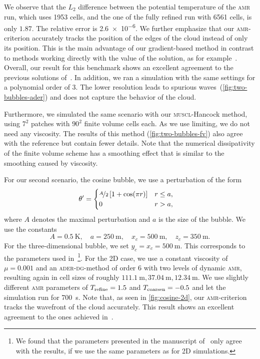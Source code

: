 \documentclass[runningheads]{llncs}
\newcommand{\muscl}{\textsc{muscl}-Hancock}
\newcommand{\aderdg}{\textsc{ader-dg}}
\newcommand{\amr}{\textsc{amr}}
\newcommand{\pertubationPotT}{\theta'}
\begin{document}
We observe that the $L_2$ difference between the potential temperature of the \amr{} run, which uses 1953 cells, and the one of the fully refined run with 6561 cells, is only $1.87$.
The relative error is \num{2.6e-6}.
We further emphasize that our \amr{}-criterion accurately tracks the position of the edges of the cloud instead of only its position.
This is the main advantage of our gradient-based method in contrast to methods working directly with the value of the solution, as for example~\cite{muller2010adaptive}.
Overall, our result for this benchmark shows an excellent agreement to the previous solutions of~\cite{muller2010adaptive}.
In addition, we ran a simulation with the same settings for a polynomial order of 3.
The lower resolution leads to spurious waves~(\cref{fig:two-bubbles-ader}) and does not capture the behavior of the cloud.

Furthermore, we simulated the same scenario with our \muscl{} method, using $7^2$ patches with $90^2$ finite volume cells each.
As we use limiting, we do not need any viscosity.
The results of this method (\cref{fig:two-bubbles-fv}) also agree with the reference but contain fewer details.
Note that the numerical dissipativity of the finite volume scheme has a smoothing effect that is similar to the smoothing caused by viscosity.

For our second scenario, the cosine bubble, we use a perturbation of the form
\begin{align}
  \label{eq:cos-pertubation}
  \pertubationPotT &= \begin{cases}
    \nicefrac{A}{2} \left[ 1 + \cos(\pi r) \right] & r \leq a, \\
    0 & r > a,
    \end{cases}
\end{align}
where $A$ denotes the maximal perturbation and $a$ is the size of the bubble.
We use the constants
\begin{equation}\label{eq:cosine-bubble}
  A = \SI{0.5}{\K}, \quad a = \SI{250}{\m}, \quad x_c = \SI{500}{\m}, \quad z_c = \SI{350}{\m}.
\end{equation}
For the three-dimensional bubble, we set $y_c = x_c = \SI{500}{\m}$.
This corresponds to the parameters used in~\cite{kelly2012continuous}\footnote{%
We found that the parameters presented in the manuscript of~\cite{kelly2012continuous} only agree with the results, if we use the same parameters as for 2D simulations.}.
For the 2D case, we use a constant viscosity of $\mu = 0.001$ and an \aderdg{}-method of order 6 with two levels of dynamic \amr{}, resulting again in cell sizes of roughly $\SI{111.1}{\m}, \SI{37.04}{\m}, \SI{12.34}{\m}$.
We use slightly different \amr{} parameters of $T_\text{refine} = 1.5$ and $T_\text{coarsen} = -0.5$ and let the simulation run for \SI{700}{\s}.
Note that, as seen in \cref{fig:cosine-2d}, our \amr{}-criterion tracks the wavefront of the cloud accurately.
This result shows an excellent agreement to the ones achieved in~\cite{giraldo2008study,muller2010adaptive}.
\end{document}
